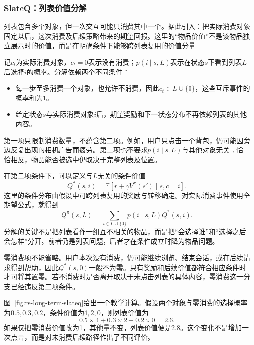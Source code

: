 \Needspace{110mm}
\subsubsection{SlateQ：列表价值分解}
\label{sec:rs-slateq}

列表包含多个对象，但一次交互可能只消费其中一个。据此引入：把实际消费对象固定以后，这次消费及后续策略带来的期望回报。这里的“物品价值”不是该物品独立展示时的价值，而是在明确条件下能够跨列表复用的价值分量

记$c_t$为实际消费对象，$c_t=0$表示没有消费；$p(i\mid s,L)$表示在状态$s$下看到列表$L$后选择$i$的概率。分解依赖两个不同条件：
\begin{itemize}
 \item 每一步至多消费一个对象，也允许不消费，因此$c_t\in L\cup\{0\}$，这些互斥事件的概率和为1。
 \item 给定状态$s$与实际消费对象$i$后，期望奖励和下一状态分布不再依赖列表的其他内容。
\end{itemize}
第一项只限制消费数量，不蕴含第二项。例如，用户只点击一个背包，仍可能因旁边反复出现的相机广告而疲劳。第二项也不要求$p(i\mid s,L)$与其他对象无关；恰恰相反，物品能否被选中仍取决于完整列表及位置。

在第二项条件下，可以定义与$L$无关的条件价值
\begin{equation}
 \overline Q^\pi(s,i)
 =\mathbb{E}[r+\gamma V^\pi(s')\mid s,c=i].
 \label{eq:rs-slateq-item-value}
\end{equation}
这里的条件分布由假设中可跨列表复用的奖励与转移确定。对实际消费事件使用全期望公式，就得到
\begin{equation}
 Q^\pi(s,L)=
 \sum_{i\in L\cup\{0\}}
 p(i\mid s,L)\overline Q^\pi(s,i).
 \label{eq:rs-slateq-decomposition}
\end{equation}
分解的关键不是把列表看作一组互不相关的物品，而是把“会选择谁”和“选择之后会怎样”分开。前者仍是列表问题，后者才在条件成立时降为物品问题。

零消费项不能省略。用户本次没有消费，仍可能继续浏览、结束会话，或在后续请求得到帮助，因此$\overline Q^\pi(s,0)$一般不为零。只有奖励和后续价值都符合相应条件时才可将其置零。若不消费时是否离开取决于未点击列表的具体内容，零消费这一分支已经违反第二项条件。

图~\ref{fig:rs-long-term-slateq}给出一个教学计算。假设两个对象与零消费的选择概率为$0.5,0.3,0.2$，条件价值为$4,2,0$，则列表价值为
\[
 0.5\times4+0.3\times2+0.2\times0=2.6.
\]
如果仅把零消费价值改为1，其他量不变，列表价值便是2.8。这个变化不是增加一次点击，而是对未消费后续路径作出了不同评价。

